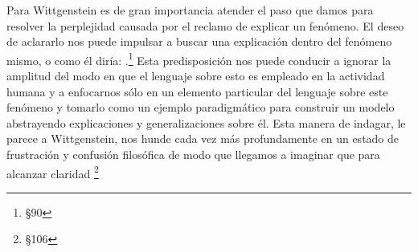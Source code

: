   Para Wittgenstein es de gran importancia atender el paso que damos para
  resolver la perplejidad causada por el reclamo de explicar un fenómeno. El
  deseo de aclararlo nos puede impulsar a buscar una explicación dentro del
  fenómeno mismo, o como él diría: .\footnote{\S90} Esta predisposición nos puede conducir
  a ignorar la amplitud del modo en que el lenguaje sobre esto es empleado en la
  actividad humana y a enfocarnos sólo en un elemento particular del lenguaje
  sobre este fenómeno y tomarlo como un ejemplo paradigmático para construir un
  modelo abstrayendo explicaciones y generalizaciones sobre él. Esta manera de
  indagar, le parece a Wittgenstein, nos hunde cada vez más profundamente en un
  estado de frustración y confusión filosófica de modo que llegamos a imaginar
  que para alcanzar claridad \footnote{\S106}

